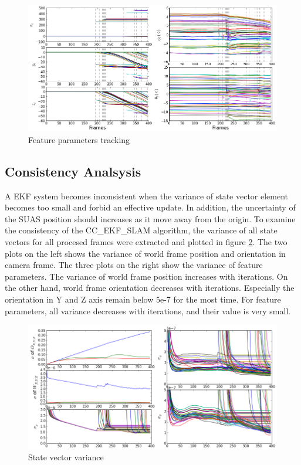 \begin{figure}[h]
\centering
\includegraphics[width=12cm, keepaspectratio=true]
{./Figures/fltfig/cut1/Figure20.png}
\caption{Feature parameters tracking}
\label{fltfig:2}
\end{figure}

\subsection{Consistency Analsysis}
A EKF system becomes inconsistent when the variance of state vector
element becomes too small and forbid an effective update. In addition,
the uncertainty of the SUAS position should increases as it move away
from the origin. To examine the consistency of the CC\_EKF\_SLAM
algorithm, the variance of all state vectors for all procesed frames
were extracted and plotted in figure \ref{fltfig:3}. The two plots on
the left shows the variance of world frame position and orientation in
camera frame. The three plots on the right show the variance of
feature parameters. The variance of world frame position increases
with iterations. On the other hand, world frame orientation decreases
with iterations. Especially the orientation in Y and Z axis remain
below 5e-7 for the most time. For feature parameters, all variance
decreases with iterations, and their value is very small. 
\begin{figure}[h]
\centering
\includegraphics[width=12cm, keepaspectratio=true]
{./Figures/fltfig/cut1/Figure40.png}
\caption{State vector variance}
\label{fltfig:3}
\end{figure}


